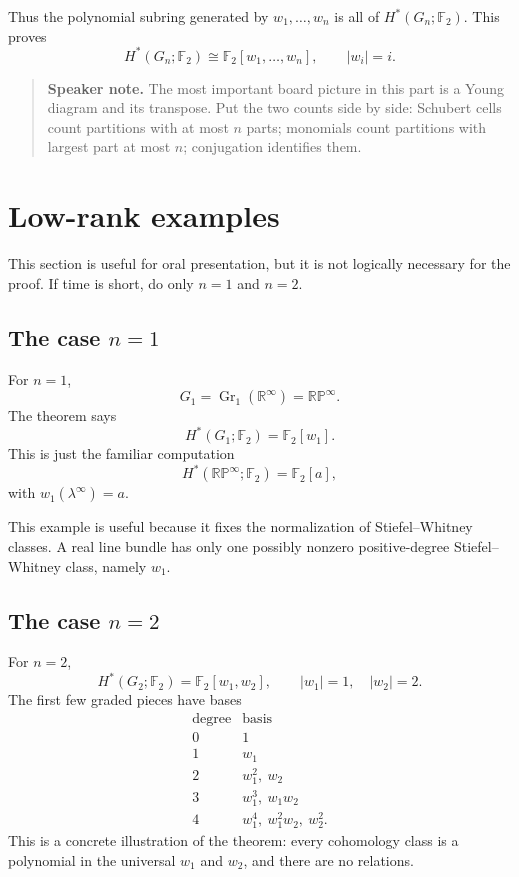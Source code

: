 \documentclass[11pt]{article}
\theoremstyle{remark}
\newcommand{\F}{\mathbb F}
\newcommand{\R}{\mathbb R}
\newcommand{\RP}{\mathbb{RP}}
\newcommand{\Gr}{\operatorname{Gr}}
\newcommand{\Gn}{G_n}
\newenvironment{talknote}{\begin{quote}\small\textbf{Speaker note.} }{\end{quote}}
\begin{document}
Thus the polynomial subring generated by $w_1,\dots,w_n$ is all of $H^*(\Gn;\F_2)$.  This proves
\[
  H^*(\Gn;\F_2)\cong \F_2[w_1,\dots,w_n],\qquad |w_i|=i.
\]

\begin{talknote}
The most important board picture in this part is a Young diagram and its transpose.  Put the two counts side by side: Schubert cells count partitions with at most $n$ parts; monomials count partitions with largest part at most $n$; conjugation identifies them.
\end{talknote}

\section{Low-rank examples}

This section is useful for oral presentation, but it is not logically necessary for the proof.  If time is short, do only $n=1$ and $n=2$.

\subsection{The case $n=1$}

For $n=1$,
\[
  G_1=\Gr_1(\R^\infty)=\RP^\infty.
\]
The theorem says
\[
  H^*(G_1;\F_2)=\F_2[w_1].
\]
This is just the familiar computation
\[
  H^*(\RP^\infty;\F_2)=\F_2[a],
\]
with $w_1(\lambda^\infty)=a$.

This example is useful because it fixes the normalization of Stiefel--Whitney classes.  A real line bundle has only one possibly nonzero positive-degree Stiefel--Whitney class, namely $w_1$.

\subsection{The case $n=2$}

For $n=2$,
\[
  H^*(G_2;\F_2)=\F_2[w_1,w_2],
  \qquad |w_1|=1,
  \quad |w_2|=2.
\]
The first few graded pieces have bases
\[
\begin{array}{c|l}
\text{degree} & \text{basis}\\
\hline
0 & 1\\
1 & w_1\\
2 & w_1^2,\ w_2\\
3 & w_1^3,\ w_1w_2\\
4 & w_1^4,\ w_1^2w_2,\ w_2^2.
\end{array}
\]
This is a concrete illustration of the theorem: every cohomology class is a polynomial in the universal $w_1$ and $w_2$, and there are no relations.
\end{document}
